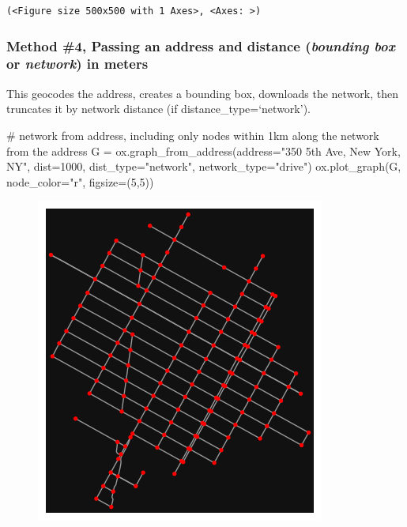 \documentclass[
  letterpaper,
  DIV=11,
  numbers=noendperiod]{scrreprt}
\newenvironment{Shaded}{\begin{snugshade}}{\end{snugshade}}
\newcommand{\CommentTok}[1]{\textcolor[rgb]{0.37,0.37,0.37}{#1}}
\newcommand{\DecValTok}[1]{\textcolor[rgb]{0.68,0.00,0.00}{#1}}
\newcommand{\NormalTok}[1]{\textcolor[rgb]{0.00,0.23,0.31}{#1}}
\newcommand{\OperatorTok}[1]{\textcolor[rgb]{0.37,0.37,0.37}{#1}}
\newcommand{\StringTok}[1]{\textcolor[rgb]{0.13,0.47,0.30}{#1}}
\begin{document}
\begin{verbatim}
(<Figure size 500x500 with 1 Axes>, <Axes: >)
\end{verbatim}

\hypertarget{method-4-passing-an-address-and-distance-bounding-box-or-network-in-meters}{%
\subsubsection{\texorpdfstring{Method \#4, Passing an address and
distance (\emph{bounding box} or \emph{network}) in
meters}{Method \#4, Passing an address and distance (bounding box or network) in meters}}\label{method-4-passing-an-address-and-distance-bounding-box-or-network-in-meters}}

This geocodes the address, creates a bounding box, downloads the
network, then truncates it by network distance (if
distance\_type=`network').

\begin{Shaded}
\begin{Highlighting}[]
\CommentTok{\# network from address, including only nodes within 1km along the network from the address}
\NormalTok{G }\OperatorTok{=}\NormalTok{ ox.graph\_from\_address(address}\OperatorTok{=}\StringTok{"350 5th Ave, New York, NY"}\NormalTok{, dist}\OperatorTok{=}\DecValTok{1000}\NormalTok{, dist\_type}\OperatorTok{=}\StringTok{"network"}\NormalTok{, network\_type}\OperatorTok{=}\StringTok{"drive"}\NormalTok{)}
\NormalTok{ox.plot\_graph(G, node\_color}\OperatorTok{=}\StringTok{"r"}\NormalTok{, figsize}\OperatorTok{=}\NormalTok{(}\DecValTok{5}\NormalTok{,}\DecValTok{5}\NormalTok{))}
\end{Highlighting}
\end{Shaded}

\begin{figure}[H]

{\centering \includegraphics{labs/w07_OSM_files/figure-pdf/cell-10-output-1.png}

}

\end{figure}
\end{document}
